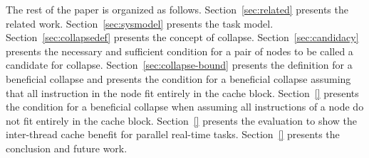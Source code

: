 The rest of the paper is organized as follows. Section~\ref{sec:related} presents the related work. Section~\ref{sec:sysmodel} presents the task model. Section~\ref{sec:collapsedef} presents the concept of collapse. Section~\ref{sec:candidacy} presents the necessary and sufficient condition for a pair of nodes to be called a candidate for collapse. Section~\ref{sec:collapse-bound} presents the definition for a beneficial collapse and presents the condition for a beneficial collapse assuming that all instruction in the node fit entirely in the cache block. Section~\ref{} presents the condition for a beneficial collapse when assuming all instructions of a node do not fit entirely in the cache block. Section~\ref{} presents the evaluation to show the inter-thread cache benefit for parallel real-time tasks. Section~\ref{} presents the conclusion and future work.